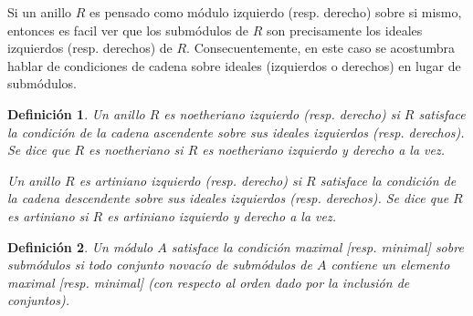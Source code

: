 \documentclass{report}
\newtheorem{definition}{Definición}
\begin{document}
  Si un anillo \(R\) es pensado como módulo izquierdo (resp. derecho) sobre si mismo, entonces es facil ver que los submódulos de \(R\) son precisamente los ideales izquierdos (resp. derechos) de \(R\).
  Consecuentemente, en este caso se acostumbra hablar de condiciones de cadena sobre ideales (izquierdos o derechos) en lugar de submódulos.

  \begin{definition}
    Un anillo \(R\) es \emph{noetheriano izquierdo} (resp. \emph{derecho}) si \(R\) satisface la condición de la cadena ascendente sobre sus ideales izquierdos (resp. derechos).
    Se dice que \(R\) es \emph{noetheriano} si \(R\) es noetheriano izquierdo y derecho a la vez.

    Un anillo \(R\) es \emph{artiniano izquierdo} (resp. \emph{derecho}) si \(R\) satisface la condición de la cadena descendente sobre sus ideales izquierdos (resp. derechos).
    Se dice que \(R\) es \emph{artiniano} si \(R\) es artiniano izquierdo y derecho a la vez.
  \end{definition}

  \begin{definition}
    Un módulo \(A\) satisface la \emph{condición maximal} [resp. \emph{minimal}] \emph{sobre submódulos} si todo conjunto novacío de submódulos de \(A\) contiene un elemento maximal [resp. minimal] (con respecto al orden dado por la inclusión de conjuntos).
  \end{definition}
\end{document}
